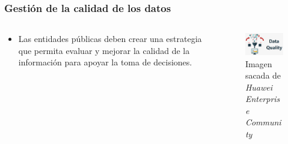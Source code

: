 \begin{frame}[allowframebreaks]

  \frametitle{Gestión de la calidad de los datos}

  \begin{columns}
    \begin{column}{.5\textwidth}
      \begin{itemize}
        \item Las entidades públicas deben crear una estrategia que permita evaluar y mejorar la calidad de la información para apoyar la toma de decisiones.
      \end{itemize}  
    \end{column}

    \begin{column}{.5\textwidth}
      \begin{figure}[ht]
        \centering
        \includegraphics[width=\textwidth]{img/DataQuality.png}
        \caption{Imagen sacada de \textit{Huawei Enterprise Community}\cite{huawei2023gestion}}
      \end{figure}

    \end{column}
  \end{columns}  


\end{frame}


